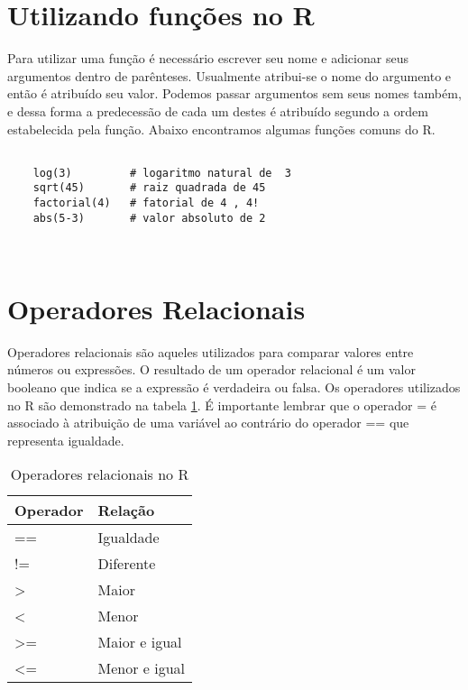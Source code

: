\section{Utilizando funções no R}

Para utilizar uma função é necessário escrever seu nome e adicionar seus argumentos dentro de parênteses. Usualmente atribui-se o nome do argumento e então é atribuído seu valor. Podemos passar argumentos sem seus nomes também, e dessa forma a predecessão de cada um destes é atribuído segundo a ordem estabelecida pela função. Abaixo encontramos algumas funções comuns do R.

\begin{scriptsize}
	\estiloR
	\begin{lstlisting}[]
	
	log(3)         # logaritmo natural de  3 
	sqrt(45)       # raiz quadrada de 45 
	factorial(4)   # fatorial de 4 , 4!
	abs(5-3)       # valor absoluto de 2  
	
	
	\end{lstlisting}
\end{scriptsize}

\section{Operadores Relacionais} 

Operadores relacionais são aqueles utilizados para comparar valores entre números ou expressões. O resultado de um operador relacional é um valor booleano que indica se a expressão é verdadeira ou falsa. Os operadores utilizados no R são demonstrado na tabela \ref{tabela_predecessao}. É importante lembrar que o operador = é associado à atribuição de uma variável ao contrário do operador == que representa igualdade.

\FloatBarrier
\begin{table}[h]
	\centering
	\begin{tabular}{@{}ll@{}}
		\toprule
		Operador & Relação \\ \midrule
		== & Igualdade \\
		!= & Diferente \\
		> & Maior \\
		< & Menor \\
		>= & Maior e igual \\
		<= & Menor e igual \\ \bottomrule
	\end{tabular}
	\caption{Operadores relacionais no R}
	\label{tabela_predecessao}
\end{table}
\FloatBarrier

